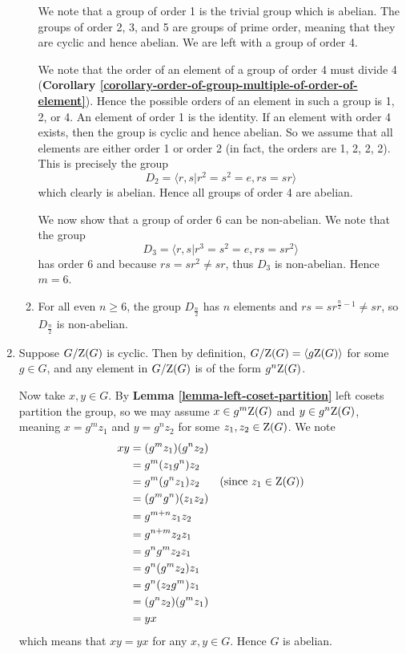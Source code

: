 \begin{enumerate}
\begin{enumerate}[label=(\alph*)]
        We note that a group of order 1 is the trivial group which is abelian. The groups of order 2, 3, and 5 are groups of prime order, meaning that they are cyclic and hence abelian. We are left with a group of order 4.

        We note that the order of an element of a group of order 4 must divide 4 (\textbf{Corollary \ref{corollary-order-of-group-multiple-of-order-of-element}}). Hence the possible orders of an element in such a group is 1, 2, or 4. An element of order 1 is the identity. If an element with order 4 exists, then the group is cyclic and hence abelian. So we assume that all elements are either order 1 or order 2 (in fact, the orders are 1, 2, 2, 2). This is precisely the group
        \[
            D_2 = \langle r, s \vert r^2 = s^2 = e, rs = sr\rangle
        \]
        which clearly is abelian. Hence all groups of order 4 are abelian.

        We now show that a group of order 6 can be non-abelian. We note that the group
        \[
            D_3 =  \langle r, s \vert r^3 = s^2 = e, rs = sr^2\rangle
        \]
        has order 6 and because $rs = sr^2 \neq sr$, thus $D_3$ is non-abelian. Hence $m = 6$.

        \item For all even $n \geq 6$, the group $D_{\frac n2}$ has $n$ elements and $rs = sr^{\frac n2 - 1} \neq sr$, so $D_{\frac n2}$ is non-abelian.
    \end{enumerate}

    \item Suppose $G / \mathrm{Z}(G)$ is cyclic. Then by definition, $G / \mathrm{Z}(G) = \langle g\mathrm{Z}(G)\rangle$ for some $g \in G$, and any element in $G/\mathrm{Z}(G)$ is of the form $g^n\mathrm{Z}(G)$.

    Now take $x, y \in G$. By \textbf{Lemma \ref{lemma-left-coset-partition}} left cosets partition the group, so we may assume $x \in g^m\mathrm{Z}(G)$ and $y \in g^n\mathrm{Z}(G)$, meaning $x = g^mz_1$ and $y = g^nz_2$ for some $z_1, z_2 \in \mathrm{Z}(G)$. We note
    \begin{align*}
        xy &= (g^mz_1)(g^nz_2)\\
        &= g^m(z_1g^n)z_2\\
        &= g^m(g^nz_1)z_2 & (\text{since }z_1 \in \mathrm{Z}(G))\\
        &= (g^mg^n)(z_1z_2)\\
        &= g^{m+n}z_1z_2\\
        &= g^{n+m}z_2z_1\\
        &= g^ng^mz_2z_1\\
        &= g^n(g^mz_2)z_1\\
        &= g^n(z_2g^m)z_1\\
        &= (g^nz_2)(g^mz_1)\\
        &= yx
    \end{align*}
    which means that $xy = yx$ for any $x, y \in G$. Hence $G$ is abelian.
\end{enumerate}

